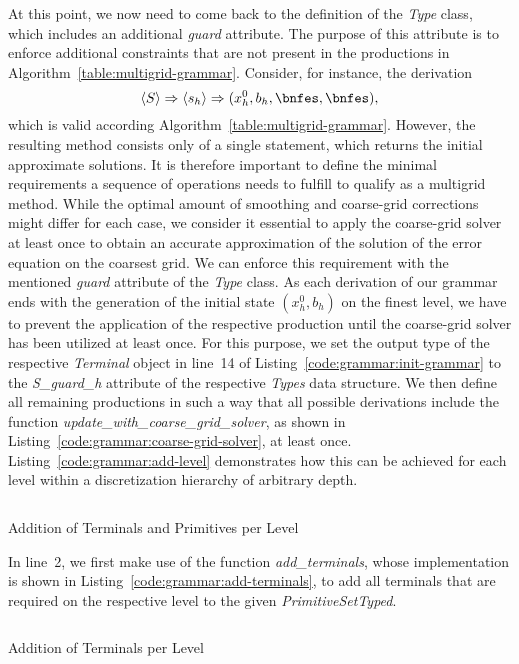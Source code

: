 At this point, we now need to come back to the definition of the \emph{Type} class, which includes an additional \emph{guard} attribute.
The purpose of this attribute is to enforce additional constraints that are not present in the productions in Algorithm~\ref{table:multigrid-grammar}.
Consider, for instance, the derivation
\begin{equation*}
\ps{S} \Rightarrow \ps{s_h} \Rightarrow (x_h^0, b_h, \bnfes, \bnfes),
\end{equation*}
which is valid according Algorithm~\ref{table:multigrid-grammar}.
However, the resulting method consists only of a single statement, which returns the initial approximate solutions.
It is therefore important to define the minimal requirements a sequence of operations needs to fulfill to qualify as a multigrid method. 
While the optimal amount of smoothing and coarse-grid corrections might differ for each case, we consider it essential to apply the coarse-grid solver at least once to obtain an accurate approximation of the solution of the error equation on the coarsest grid.
We can enforce this requirement with the mentioned \emph{guard} attribute of the \emph{Type} class.
As each derivation of our grammar ends with the generation of the initial state $\left(x_h^0, b_h\right)$ on the finest level, we have to prevent the application of the respective production until the coarse-grid solver has been utilized at least once.
For this purpose, we set the output type of the respective \emph{Terminal} object in line~14 of Listing~\ref{code:grammar:init-grammar} to the \emph{S\_guard\_h} attribute of the respective \emph{Types} data structure.
We then define all remaining productions in such a way that all possible derivations include the function \emph{update\_with\_coarse\_grid\_solver}, as shown in Listing~\ref{code:grammar:coarse-grid-solver}, at least once.
Listing~\ref{code:grammar:add-level} demonstrates how this can be achieved for each level within a discretization hierarchy of arbitrary depth.
\begin{listing}
	\inputminted[linenos]{python}{evostencils/grammar/add_level.py}
	\caption{Addition of Terminals and Primitives per Level}
	\label{code:grammar:add-level}
\end{listing}
In line~2, we first make use of the function \emph{add\_terminals}, whose implementation is shown in Listing~\ref{code:grammar:add-terminals}, to add all terminals that are required on the respective level to the given \emph{PrimitiveSetTyped}.
\begin{listing}
	\inputminted{python}{evostencils/grammar/add_terminals.py}
	\caption{Addition of Terminals per Level}
	\label{code:grammar:add-terminals}
\end{listing}
